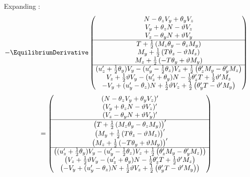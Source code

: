 Expanding :
\begin{equation*}
-\EquilibriumDerivative\begin{pmatrix}
N   - \theta_z V_{\FrameYi} + \theta_{\FrameYi}  V_z \\
V_{\FrameYi} + \theta_z   N - \vartheta V_z \\
V_z - \theta_{\FrameYi}   N + \vartheta V_{\FrameYi} \\ \hline
T + \frac{1}{2}\left(M_z \theta_{\FrameYi} - \theta_z M_{\FrameYi} \right) \\
M_{\FrameYi} + \frac{1}{2}\left(T \theta_z - \vartheta M_z \right) \\
M_z + \frac{1}{2}\left(-T \theta_{\FrameYi} + \vartheta M_{\FrameYi} \right) \\ \hline
(u_z^{\prime} + \frac{1}{2}\theta_{\FrameYi}) V_{\FrameYi} - (u_{\FrameYi}^{\prime} - \frac{1}{2}\theta_z) V_z  + \frac{1}{2}\left(\theta_z^{\prime} M_{\FrameYi} - \theta_{\FrameYi}^{\prime} M_z\right)\\
V_z + \frac{1}{2}\vartheta V_{\FrameYi} - (u_z^{\prime} + \theta_{\FrameYi}) N - \frac{1}{2}\theta_z^{\prime} T + \frac{1}{2}\vartheta^{\prime} M_z \\
-V_{\FrameYi} + (u_{\FrameYi}^{\prime} - \theta_z)N + \frac{1}{2}\vartheta V_z + \frac{1}{2} \left(\theta_{\FrameYi}^{\prime} T - \vartheta^{\prime} M_{\FrameYi}\right)
\end{pmatrix}
\end{equation*}
%
\begin{equation*}
=\begin{pmatrix}
(N   - \theta_z V_{y} + \theta_{y}  V_z)' \\
(V_{y} + \theta_z   N - \vartheta V_z)' \\
(V_z - \theta_{y}   N + \vartheta V_{y})' \\ \hline
\left(T   + \frac{1}{2}\left(M_z \theta_{y} - \theta_z  M_{y} \right)\right)' \\
\left(M_{y} + \frac{1}{2}\left(  T \theta_z - \vartheta M_z \right)\right)' \\
\left(M_z + \frac{1}{2}\left( -T \theta_{y} + \vartheta M_{y} \right)\right)' \\ \hline
\left((u_z^{\prime} + \frac{1}{2}\theta_{y}) V_{y} - (u_{y}^{\prime} - \frac{1}{2}\theta_z) V_z  + \frac{1}{2}\left(\theta_z^{\prime} M_{y} - \theta_{y}^{\prime} M_z\right) \right)\\
\left(V_z + \frac{1}{2}\vartheta V_{y} - (u_z^{\prime} + \theta_{y}) N - \frac{1}{2}\theta_z^{\prime} T + \frac{1}{2}\vartheta^{\prime} M_z\right) \\
\left(-V_{y} + (u_{y}^{\prime} - \theta_z)N + \frac{1}{2}\vartheta V_z + \frac{1}{2} \left(\theta_{y}^{\prime} T - \vartheta^{\prime} M_{y}\right)\right)
\end{pmatrix}
\end{equation*}


